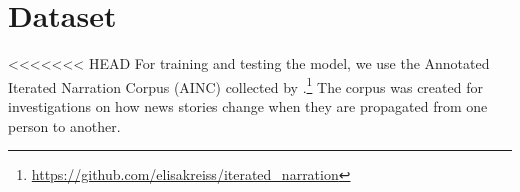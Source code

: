 \documentclass[11pt,a4paper]{article}
\begin{document}




\section{Dataset}
<<<<<<< HEAD
For training and testing the model, we use the Annotated Iterated Narration Corpus (AINC) collected by \citet{Kreiss:2019}.\footnote{\url{https://github.com/elisakreiss/iterated_narration}} The corpus was created for investigations on how news stories change when they are propagated from one person to another.
\end{document}
